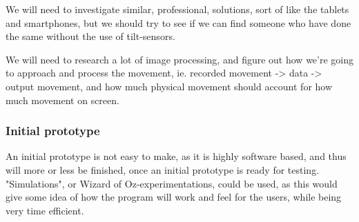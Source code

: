 We will need to investigate similar, professional, solutions, sort of like the tablets and smartphones, but we should try to see if we can find someone who have done the same without the use of tilt-sensors.
\bigskip

We will need to research a lot of image processing, and figure out how we're going to approach and process the movement, ie. recorded movement -> data -> output movement, and how much physical movement should account for how much movement on screen. 

\subsubsection*{Initial prototype}
An initial prototype is not easy to make, as it is highly software based, and thus will more or less be finished, once an initial prototype is ready for testing. "Simulations", or Wizard of Oz-experimentations, could be used, as this would give some idea of how the program will work and feel for the users, while being very time efficient.



\clearpage

\clearpage

\clearpage

\clearpage

\clearpage